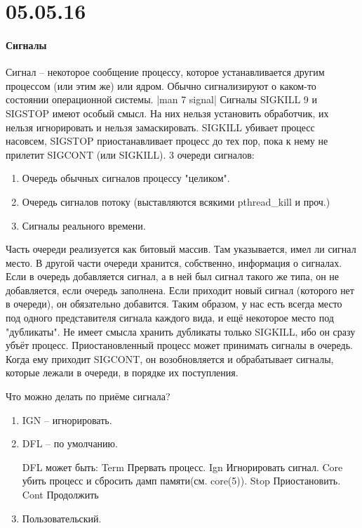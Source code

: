 \documentclass[a4paper,10pt]{article}
\begin{document}
\section{05.05.16}
\paragraph{Сигналы}
Сигнал -- некоторое сообщение процессу, которое устанавливается другим процессом (или этим же) или ядром. Обычно сигнализируют о каком-то состоянии операционной системы.
|man 7 signal|
Сигналы SIGKILL 9 и SIGSTOP имеют особый смысл. На них нельзя установить обработчик, их нельзя игнорировать и нельзя замаскировать.
SIGKILL убивает процесс насовсем, SIGSTOP приостанавливает процесс до тех пор, пока к нему не прилетит SIGCONT (или SIGKILL).
3 очереди сигналов:
\begin{enumerate}
 \item Очередь обычных сигналов процессу "целиком".
 \item Очередь сигналов потоку (выставляются всякими pthread\_kill и проч.)
 \item Сигналы реального времени.
\end{enumerate}
Часть очереди реализуется как битовый массив. Там указывается, имел ли сигнал место. 
В другой части очереди хранится, собственно, информация о сигналах. Если в очередь добавляется сигнал, а в ней был сигнал такого же типа, он не добавляется, если очередь заполнена. Если приходит новый сигнал (которого нет в очереди), он обязательно добавится.
Таким образом, у нас есть всегда место под одного представителя сигнала каждого вида, и ещё некоторое место под "дубликаты".
Не имеет смысла хранить дубликаты только SIGKILL, ибо он сразу убъёт процесс.
Приостановленный процесс может принимать сигналы в очередь. Когда ему приходит SIGCONT, он возобновляется и обрабатывает сигналы, которые лежали в очереди, в порядке их поступления.

Что можно делать по приёме сигнала?
\begin{enumerate}
 \item IGN -- игнорировать.
 \item DFL -- по умолчанию.
 
DFL может быть:
Term   Прервать процесс.
Ign    Игнорировать сигнал.
Core   убить процесс и сбросить дамп памяти(см. core(5)).
Stop   Приостановить.
Cont   Продолжить
 \item Пользовательский.
\end{enumerate}
\end{document}
